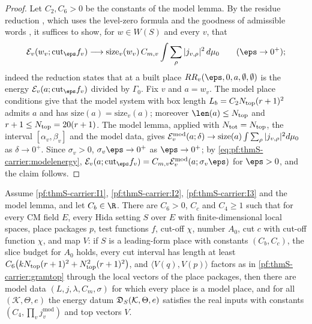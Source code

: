 \begin{proof}
Let $C_2,C_6>0$ be the constants of the model lemma. By the residue reduction
, which uses the level-zero formula
 and the goodness of admissible words
, it suffices to show, for $w\in W(S)$ and every $v$, that
\[
\mathcal E_v(w_v;\mathrm{cut}_\eps f_v)\longrightarrow\mathrm{size}_v(w_v)\,C_{m,v}\int\sum_\rho|j_{v,\rho}|^2\,d\mu_0
\qquad(\eps\to0^+);
\]
indeed the reduction states that at a built place $RR_v(\eps,0,a,\emptyset,\emptyset)$ is the energy
$\mathcal E_v(a;\mathrm{cut}_\eps f_v)$ divided by $\Gamma_0$. Fix $v$ and $a=w_v$. The model place conditions give that the
model system with box length $L_b=C_2N_{\mathrm{top}}(r+1)^2$ admits $a$ and has $\mathrm{size}(a)=\mathrm{size}_v(a)$;
moreover $\len(a)\le\thmScarrierNtop$ and $r+1\le N_{\mathrm{top}}=20(r+1)$. The model lemma, applied with
$N_{\mathrm{tot}}=N_{\mathrm{top}}$, the interval $[\alpha_v,\beta_v]$ and the model data, gives
$\mathcal{E}^{\mathrm{mod}}_v(a;\delta)\to\mathrm{size}(a)\int\sum_\rho|j_{v,\rho}|^2d\mu_0$ as $\delta\to0^+$. Since
$\sigma_v>0$, $\sigma_v\eps\to0^+$ as $\eps\to0^+$; by \eqref{eq:pf:thmS-carrier:modelenergy},
$\mathcal E_v(a;\mathrm{cut}_\eps f_v)=C_{m,v}\thmScarrierEn^{\mathrm{mod}}_v(a;\sigma_v\eps)$ for $\eps>0$, and the claim
follows.
\end{proof}

\begin{theorem}\label{pf:thmS-carrier:compact}
Assume \ref{pf:thmS-carrier:I1}, \ref{pf:thmS-carrier:I2}, \ref{pf:thmS-carrier:I3} and the model lemma, and let $C_b\in\R$.
There are $C_6>0$, $C_c$ and $C_4\ge1$ such that for every CM field $E$, every Hida setting $S$ over $E$ with
finite-dimensional local spaces, place packages $p$, test functions $f$, cut-off $\chi$, number $A_0$, cut $c$ with cut-off
function $\chi$, and map $V$: if $S$ is a leading-form place with constants $(C_b,C_c)$, the slice budget for $A_0$ holds,
every cut interval has length at least $C_6\bigl(kN_{\mathrm{top}}(r+1)^2+N_{\mathrm{top}}^2(r+1)^2\bigr)$, and
$\langle V(q),V(p)\rangle$ factors as in \cref{pf:thmS-carrier:gramtop} through the local vectors of the place packages, then
there are model data $(L,j,\lambda,C_m,\sigma)$ for which every place is a model place, and for all $(\mathcal K,\Theta,e)$
the energy datum $\mathfrak{D}_S(\mathcal K,\Theta,e)$ satisfies the real inputs with constants
$(C_4,\prod_vj_v^{\mathrm{mod}})$ and top vectors $V$.
\end{theorem}

